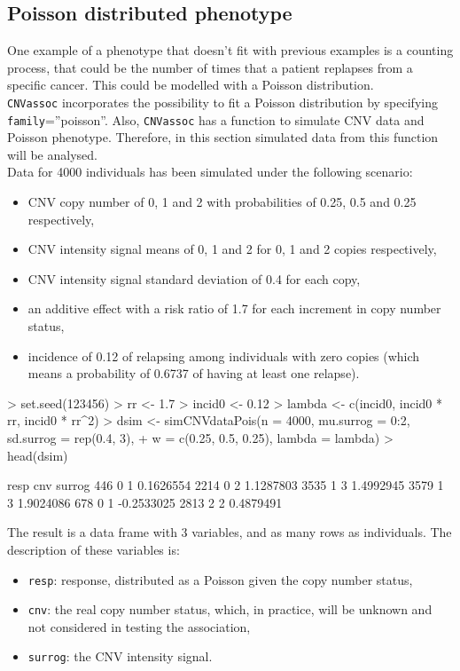 \documentclass[11pt]{article}
\begin{document}
\subsection{Poisson distributed phenotype}


One example of a phenotype that doesn't fit with previous examples is a counting process, that could be the number of times that a patient
replapses from a specific cancer. This could be modelled with a Poisson distribution.\\

\texttt{CNVassoc} incorporates the possibility to fit a Poisson distribution by specifying \texttt{family}=''poisson''.
Also,  \texttt{CNVassoc} has a function to simulate CNV data and Poisson phenotype.
Therefore, in this section simulated data from this function will be analysed. \\

Data for 4000 individuals has been simulated under the following scenario:
\begin{itemize}
\item CNV copy number of 0, 1 and 2 with probabilities of 0.25, 0.5 and 0.25 respectively,
\item CNV intensity signal means of 0, 1 and 2 for 0, 1 and 2 copies respectively,
\item CNV intensity signal standard deviation of 0.4 for each copy,
\item an additive effect with a risk ratio of 1.7 for each increment in copy number status,
\item incidence of 0.12 of relapsing among individuals with zero copies
(which means a probability of 0.6737 of having at least one relapse).
\end{itemize}
\begin{Schunk}
\begin{Sinput}
> set.seed(123456)
> rr <- 1.7
> incid0 <- 0.12
> lambda <- c(incid0, incid0 * rr, incid0 * rr^2)
> dsim <- simCNVdataPois(n = 4000, mu.surrog = 0:2, sd.surrog = rep(0.4, 3),
+ w = c(0.25, 0.5, 0.25), lambda = lambda)
> head(dsim)
\end{Sinput}
\begin{Soutput}
     resp cnv     surrog
446     0   1  0.1626554
2214    0   2  1.1287803
3535    1   3  1.4992945
3579    1   3  1.9024086
678     0   1 -0.2533025
2813    2   2  0.4879491
\end{Soutput}
\end{Schunk}

The result is a data frame with 3 variables, and as many rows as individuals. The description of these variables is:
\begin{itemize}
\item \texttt{resp}: response, distributed as a Poisson given the copy number status,
\item \texttt{cnv}: the real copy number status, which, in practice, will be unknown and not considered in testing the association,
\item \texttt{surrog}: the CNV intensity signal.
\end{itemize}
\end{document}
